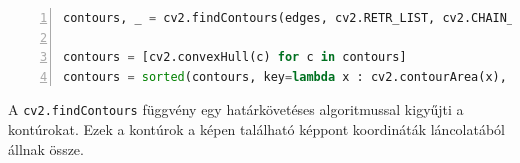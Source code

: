 \vspace{2mm}\begin{lstlisting}[language=Python, numbers=left]
contours, _ = cv2.findContours(edges, cv2.RETR_LIST, cv2.CHAIN_APPROX_SIMPLE)

contours = [cv2.convexHull(c) for c in contours]
contours = sorted(contours, key=lambda x : cv2.contourArea(x), reverse=True)[:1]
\end{lstlisting}

\par A \lstinline{cv2.findContours} függvény \cite{cv2_find_contours, SUZUKI198532} egy határkövetéses algoritmussal kigyűjti a kontúrokat. Ezek a kontúrok a képen található képpont koordináták láncolatából állnak össze.